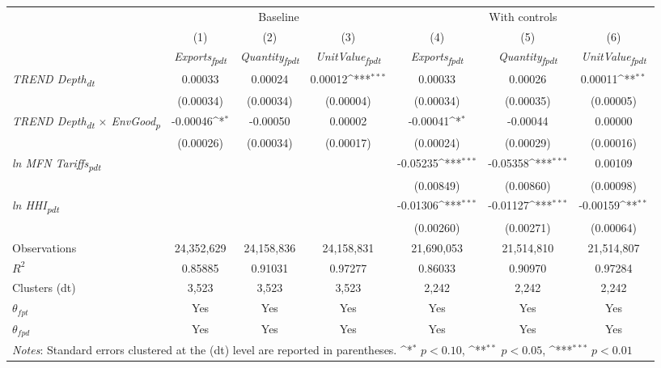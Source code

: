 {
\def\sym#1{\ifmmode^{#1}\else\(^{#1}\)\fi}
\begin{tabular}{l*{6}{c}}
\toprule
&\multicolumn{3}{c}{Baseline}&\multicolumn{3}{c}{With controls}\\\cmidrule(lr){2-4}\cmidrule(lr){5-7}
&(1)&(2)&(3)&(4)&(5)&(6)\\
&\textit{Exports\textsubscript{fpdt}}&\textit{Quantity\textsubscript{fpdt}}&\textit{UnitValue\textsubscript{fpdt}}&\textit{Exports\textsubscript{fpdt}}&\textit{Quantity\textsubscript{fpdt}}&\textit{UnitValue\textsubscript{fpdt}}\\
\midrule
\textit{TREND Depth\textsubscript{dt}} & 0.00033 & 0.00024 & 0.00012\sym{***} & 0.00033 & 0.00026 & 0.00011\sym{**}\\
 & (0.00034) & (0.00034) & (0.00004) & (0.00034) & (0.00035) & (0.00005)\\
\addlinespace
\textit{TREND Depth\textsubscript{dt} $\times$ EnvGood\textsubscript{p}} & -0.00046\sym{*} & -0.00050 & 0.00002 & -0.00041\sym{*} & -0.00044 & 0.00000\\
 & (0.00026) & (0.00034) & (0.00017) & (0.00024) & (0.00029) & (0.00016)\\
\addlinespace
\textit{ln MFN Tariffs\textsubscript{pdt}} &  &  &  & -0.05235\sym{***} & -0.05358\sym{***} & 0.00109\\
 &  &  &  & (0.00849) & (0.00860) & (0.00098)\\
\addlinespace
\textit{ln HHI\textsubscript{pdt}} &  &  &  & -0.01306\sym{***} & -0.01127\sym{***} & -0.00159\sym{**}\\
 &  &  &  & (0.00260) & (0.00271) & (0.00064)\\
\midrule
Observations & 24,352,629 & 24,158,836 & 24,158,831 & 21,690,053 & 21,514,810 & 21,514,807\\
$R^{2}$ & 0.85885 & 0.91031 & 0.97277 & 0.86033 & 0.90970 & 0.97284\\
Clusters (dt) & 3,523 & 3,523 & 3,523 & 2,242 & 2,242 & 2,242\\
$\theta_{fpt}$ & Yes & Yes & Yes & Yes & Yes & Yes\\
$\theta_{fpd}$ & Yes & Yes & Yes & Yes & Yes & Yes\\
\bottomrule
\multicolumn{7}{l}{\footnotesize \textit{Notes}: Standard errors clustered at the (dt) level are reported in parentheses. \sym{*} \(p<0.10\), \sym{**} \(p<0.05\), \sym{***} \(p<0.01\)}\\
\end{tabular}
}
